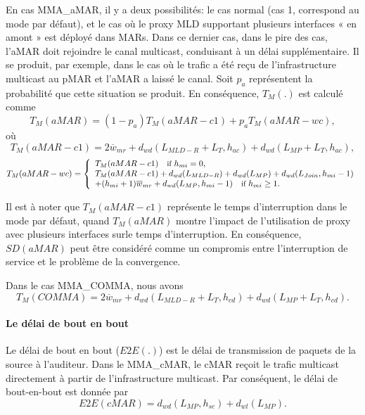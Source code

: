 En cas MMA\_aMAR, il y a deux possibilités: le cas normal (cas 1, correspond au mode par défaut), et le cas où le proxy MLD supportant plusieurs interfaces « en amont » est déployé dans MARs. Dans ce dernier cas, dans le pire des cas, l'aMAR doit rejoindre le canal multicast, conduisant à un délai supplémentaire. Il se produit, par exemple, dans le cas où le trafic a été reçu de l'infrastructure multicast au pMAR et l'aMAR a laissé le canal. Soit $ p_{a} $ représentent la probabilité que cette situation se produit. En conséquence, $ T_{M}(.) $ est calculé comme \\
\begin{equation}
T_{M}(aMAR) =(1-p_{a}) T_{M}(aMAR-c1)  +p_{a} T_{M}(aMAR-wc),
\end{equation}
où
\begin{equation}
T_{M}(aMAR-c1) =2\overline{w}_{mr} +d_{wd}(L_{MLD-R}+L_{T},h_{ac})+d_{wd}(L_{MP} +L_{T},h_{ac}),
\end{equation}
\small
\[T_{M}(aMAR-wc)  = \left\{ 
 \begin{array}{l l}
   T_{M}(aMAR-c1)  \quad \small \text{if } h_{mi} =0,  \\
    T_{M}(aMAR-c1)+ d_{wd}(L_{MLD-R})+ d_{wd}(L_{MP})  + d_{wd}(L_{Join},h_{mi}-1) \\+ (h_{mi}+1)  \overline{w}_{mr} +d_{wd}(L_{MP},h_{mi}-1)  \quad \small \text{if }h_{mi} \geq 1. 
 \end{array} \right.\] 
\normalsize 

Il est à noter que $ T_{M} (aMAR-c1) $ représente le temps d'interruption dans le mode par défaut, quand $ T_{M}(aMAR) $ montre l'impact de l'utilisation de proxy avec plusieurs interfaces sur ​​le temps d'interruption. En conséquence, $ SD(aMAR) $ peut être considéré comme un compromis entre l'interruption de service et le problème de la convergence.

Dans le cas MMA\_COMMA, nous avons\\
\begin{equation}
T_{M}(COMMA)= 2\overline{w}_{mr}+  d_{wd}(L_{MLD-R}+L_{T}, h_{cd}) + d_{wd}(L_{MP}+L_{T}, h_{cd}).
\end{equation}

\paragraph{Le délai de bout en bout}
Le délai de bout en bout ($E2E(.) $) est le délai de transmission de paquets de la source à l'auditeur. Dans le MMA\_cMAR, le cMAR reçoit le trafic multicast directement à partir de l'infrastructure multicast. Par conséquent, le délai de bout-en-bout est donnée par \\
\begin{equation}
E2E(cMAR) = d_{wd}(L_{MP},h_{sc}) + d_{wl}(L_{MP}).
\end{equation}

